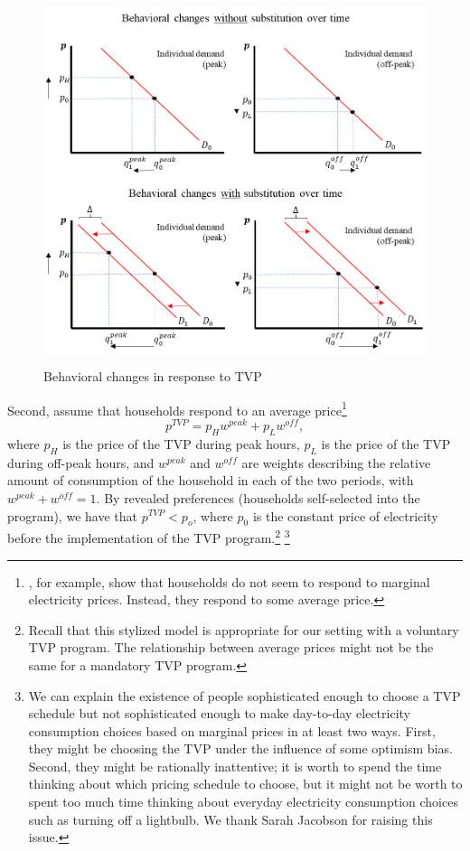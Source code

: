 \documentclass[12pt]{article}
\begin{document}
\begin{figure}[ht]
  \caption{Behavioral changes in response to TVP}\label{fig:four}
  \begin{center}
  {\includegraphics[width=1\textwidth]{./figures/image4.png}}
  \end{center}
\end{figure}

Second, assume that households respond to an average price\footnote{ \citet{itoConsumersRespondMarginal2014}, for example, show that households do not seem to respond to marginal electricity prices. Instead, they respond to some average price.}
\begin{equation}
	p^{TVP} = p_{H} w^{peak} + p_{L} w^{off},
\end{equation}
where $p_{H}$ is the price of the TVP during peak hours, $p_{L}$ is the price of the TVP during off-peak hours, and $w^{peak}$ and $w^{off}$ are weights describing the relative amount of consumption of the household in each of the two periods, with $w^{peak} + w^{off} = 1$. By revealed preferences (households self-selected into the program), we have that $p^{TVP} < p_{o}$, where $p_{0}$ is the constant price of electricity before the implementation of the TVP program.\footnote{Recall that this stylized model is appropriate for our setting with a voluntary TVP program. The relationship between average prices might not be the same for a mandatory TVP program.} \footnote{We can explain the existence of people sophisticated enough to choose a TVP schedule but not sophisticated enough to make day-to-day electricity consumption choices based on marginal prices in at least two ways. First, they might be choosing the TVP under the influence of some optimism bias. Second, they might be rationally inattentive; it is worth to spend the time thinking about which pricing schedule to choose, but it might not be worth to spent too much time thinking about everyday electricity consumption choices such as turning off a lightbulb. We thank Sarah Jacobson for raising this issue.}
\end{document}

